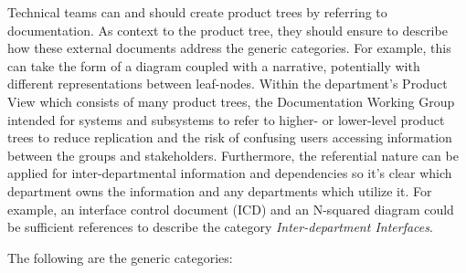 Technical teams can and should create product trees by referring to documentation.
As context to the product tree, they should ensure to describe how these external documents address the generic categories.
For example, this can take the form of a diagram coupled with a narrative, potentially with different representations between leaf-nodes.
Within the department's Product View which consists of many product trees, the Documentation Working Group intended for systems and subsystems to refer to higher- or lower-level product trees to reduce replication and the risk of confusing users accessing information between the groups and stakeholders.
Furthermore, the referential nature can be applied for inter-departmental information and dependencies so it's clear which department owns the information and any departments which utilize it.
For example, an interface control document (ICD) and an N-squared diagram could be sufficient references to describe the category \textit{Inter-department Interfaces}.

The following are the generic categories:

